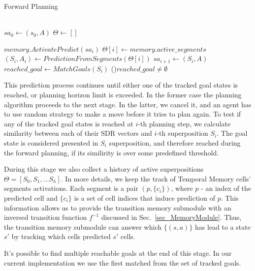 \documentclass[a4paper,twoside]{article}
\begin{document}
\begin{algorithm}
  \caption{Forward Planning} \label{alg_ForwardPlanning}
  \SetNoFillComment
  \quad \\

  $sa_0 \gets (s_0, A)$ 
  $\Theta \gets []$ 

   {
    $memory.ActivatePredict(sa_i)$ \;
    $\Theta[i] \gets memory.active\_segments$ \;
    \quad \\

    $(S_i, A_i) \gets PredictionFromSegments(\Theta[i])$\;
    $sa_{i+1} \gets (S_i, A)$ \;
    \quad \\

    $reached\_goal \gets MatchGoals(S_i)$ \;
    \If(){$reached\_goal \neq \emptyset$} {
       \;
    }{}
  }
  \Return{$\emptyset$}
\end{algorithm}

This prediction process continues until either one of the tracked goal states is reached, or planning horizon limit is exceeded. In the former case the planning algorithm proceeds to the next stage. In the latter, we cancel it, and an agent has to use random strategy to make a move before it tries to plan again. To test if any of the tracked goal states is reached at $i$-th planning step, we calculate similarity between each of their SDR vectors and $i$-th superposition $S_i$. The goal state is considered presented in $S_i$ superposition, and therefore reached during the forward planning, if its similirity is over some predefined threshold.

During this stage we also collect a history of active superpositions $\Theta = [S_0, S_1, \dots S_h]$. In more details, we keep the track of Temporal Memory cells' segments activations. Each segment is a pair $(p, \{c_i\})$, where $p$ - an index of the predicted cell and $\{c_i\}$ is a set of cell indices that induce prediction of $p$. This information allows us to provide the transition memory submodule with an inversed transition function $f^{-1}$ discussed in Sec.~\ref{sec_MemoryModule}. Thus, the transition memory submodule can answer which $\{(s, a)\}$ has lead to a state $s'$ by tracking which cells predicted $s'$ cells.

It's possible to find multiple reachable goals at the end of this stage. In our current implementation we use the first matched from the set of tracked goals.
\end{document}
